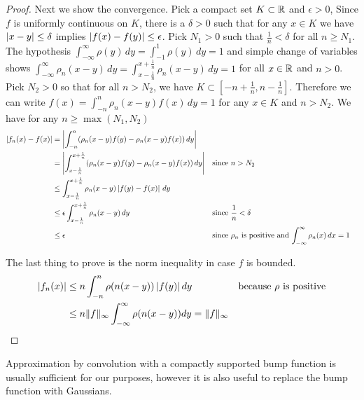\begin{proof}
Next we show the convergence.  Pick a compact set $K \subset \mathbb{R}$
and  $\epsilon > 0$,
Since $f$ is uniformly continuous on $K$,  there is a $\delta >0$ such
that for any $x \in K$ we have $\left \vert x - y \right \vert \leq \delta$ implies
$\left \vert f(x) - f(y) \right \vert \leq \epsilon$.  Pick $N_1 > 0$ such that
$\frac{1}{n} < \delta$ for all $n \geq N_1$.  The hypothesis $\int_{-\infty}^\infty
\rho(y) \, dy = \int_{-1}^1
\rho(y) \, dy = 1$ and simple change of variables shows $\int_{-\infty}^\infty
\rho_n(x - y) \, dy = \int_{x - \frac{1}{n}}^{x + \frac{1}{n}}
\rho_n(x - y) \, dy = 1$ for all $x \in \mathbb{R}$ and $n > 0$.  Pick $N_2>0$ so that for all $n > N_2$,
we have $K \subset [-n + \frac{1}{n}, n - \frac{1}{n}]$.  Therefore we can write $f(x) = \int_{- n}^{n}
\rho_n(x - y) f(x)  \, dy = 1$ for any $x \in K$ and $n > N_2$.  We
have for any $n \geq \max(N_1, N_2)$
\begin{align*}
\left \vert f_n(x) - f(x) \right \vert &= \left \vert \int_{- n}^{n} (\rho_n(x -
  y)f(y) -
\rho_n(x- y) f(x)) \, dy \right \vert \\
&= \left \vert \int_{x - \frac{1}{n}}^{x + \frac{1}{n}} (\rho_n(x -
  y)f(y) -
\rho_n(x- y) f(x)) \, dy \right \vert  & & \text{since $n>N_2$}\\
&\leq \int_{x - \frac{1}{n}}^{x + \frac{1}{n}} \rho_n(x- y) \left \vert f(y)
  - f(x) \right \vert \, dy\\
&\leq \epsilon \int_{x -\frac{1}{n}}^{x + \frac{1}{n}} \rho_n(x -  y)
\, dy & &\text{since $\frac{1}{n} < \delta$}\\
&\leq \epsilon & & \text{since $\rho_n$ is positive and
  $\int_{-\infty}^\infty \rho_n(x) \, dx = 1$}
\end{align*}

The last thing to prove is the norm inequality in case $f$ is
bounded.  
\begin{align*}
\left \vert f_n(x) \right \vert &\leq n \int_{-n}^n \rho(n(x - y)) \left \vert  f(y) \right \vert dy & &
\text{because $\rho$ is positive} \\
&\leq n \lVert f \rVert_\infty \int_{-\infty}^\infty \rho(n(x - y)) dy = \lVert f \rVert_\infty 
\end{align*}
\end{proof}

Approximation by convolution with a compactly supported bump function
is usually sufficient for our purposes, however it is also useful to
replace the bump function with Gaussians.  


